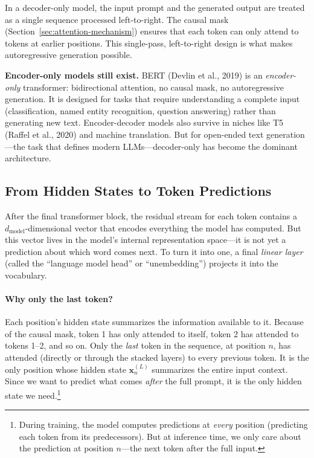 In a decoder-only model, the input prompt and the generated output are treated as a single sequence processed left-to-right. The causal mask (Section~\ref{sec:attention-mechanism}) ensures that each token can only attend to tokens at earlier positions. This single-pass, left-to-right design is what makes autoregressive generation possible.

\begin{notebox}
\textbf{Encoder-only models still exist.} BERT (Devlin et al., 2019) is an \emph{encoder-only} transformer: bidirectional attention, no causal mask, no autoregressive generation. It is designed for tasks that require understanding a complete input (classification, named entity recognition, question answering) rather than generating new text. Encoder-decoder models also survive in niches like T5 (Raffel et al., 2020) and machine translation. But for open-ended text generation---the task that defines modern LLMs---decoder-only has become the dominant architecture.
\end{notebox}

\subsection{From Hidden States to Token Predictions}
\label{sec:unembedding}

%
After the final transformer block, the residual stream for each token contains a $d_{\text{model}}$-dimensional vector that encodes everything the model has computed. But this vector lives in the model's internal representation space---it is not yet a prediction about which word comes next. To turn it into one, a final \emph{linear layer} (called the ``language model head'' or ``unembedding'') projects it into the vocabulary.

\paragraph{Why only the last token?} Each position's hidden state summarizes the information available to it. Because of the causal mask, token 1 has only attended to itself, token 2 has attended to tokens 1--2, and so on. Only the \emph{last} token in the sequence, at position $n$, has attended (directly or through the stacked layers) to every previous token. It is the only position whose hidden state $\mathbf{x}_n^{(L)}$ summarizes the entire input context. Since we want to predict what comes \emph{after} the full prompt, it is the only hidden state we need.\footnote{During training, the model computes predictions at \emph{every} position (predicting each token from its predecessors). But at inference time, we only care about the prediction at position $n$---the next token after the full input.}

